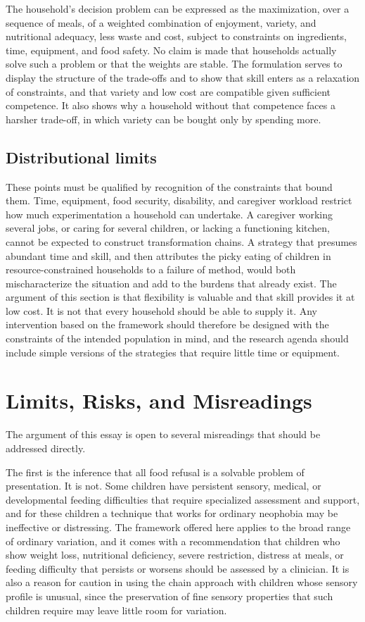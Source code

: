 \documentclass[11pt]{article}
\theoremstyle{remark}
\begin{document}
The household's decision problem can be expressed as the maximization, over a sequence of meals, of a weighted combination of enjoyment, variety, and nutritional adequacy, less waste and cost, subject to constraints on ingredients, time, equipment, and food safety. No claim is made that households actually solve such a problem or that the weights are stable. The formulation serves to display the structure of the trade-offs and to show that skill enters as a relaxation of constraints, and that variety and low cost are compatible given sufficient competence. It also shows why a household without that competence faces a harsher trade-off, in which variety can be bought only by spending more.

\subsection{Distributional limits}

These points must be qualified by recognition of the constraints that bound them. Time, equipment, food security, disability, and caregiver workload restrict how much experimentation a household can undertake. A caregiver working several jobs, or caring for several children, or lacking a functioning kitchen, cannot be expected to construct transformation chains. A strategy that presumes abundant time and skill, and then attributes the picky eating of children in resource-constrained households to a failure of method, would both mischaracterize the situation and add to the burdens that already exist. The argument of this section is that flexibility is valuable and that skill provides it at low cost. It is not that every household should be able to supply it. Any intervention based on the framework should therefore be designed with the constraints of the intended population in mind, and the research agenda should include simple versions of the strategies that require little time or equipment.

\section{Limits, Risks, and Misreadings}\label{sec:limits}

The argument of this essay is open to several misreadings that should be addressed directly.

The first is the inference that all food refusal is a solvable problem of presentation. It is not. Some children have persistent sensory, medical, or developmental feeding difficulties that require specialized assessment and support, and for these children a technique that works for ordinary neophobia may be ineffective or distressing. The framework offered here applies to the broad range of ordinary variation, and it comes with a recommendation that children who show weight loss, nutritional deficiency, severe restriction, distress at meals, or feeding difficulty that persists or worsens should be assessed by a clinician. It is also a reason for caution in using the chain approach with children whose sensory profile is unusual, since the preservation of fine sensory properties that such children require may leave little room for variation.
\end{document}
